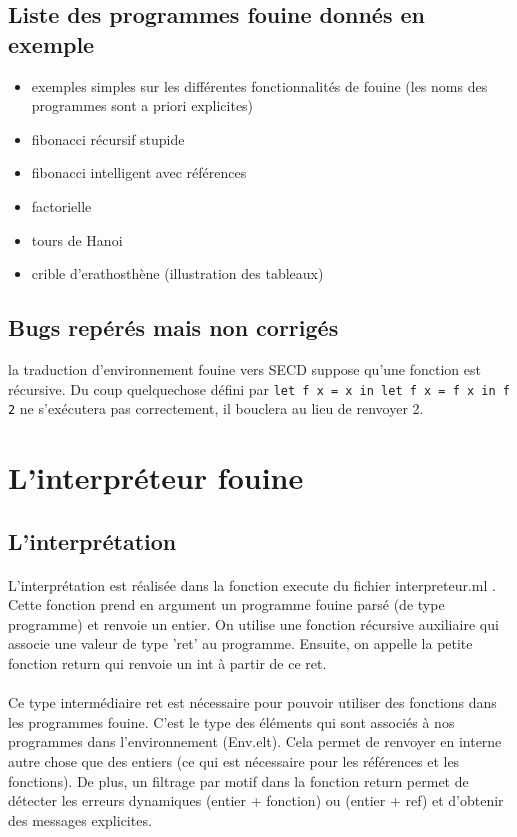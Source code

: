 \subsection{Liste des programmes fouine donnés en exemple}

\begin{itemize}
 \item exemples simples sur les différentes fonctionnalités de fouine (les noms des programmes sont a priori explicites)
 \item fibonacci récursif stupide
 \item fibonacci intelligent avec références
 \item factorielle
 \item tours de Hanoi
 \item crible d'erathosthène (illustration des tableaux)
\end{itemize}

\subsection{Bugs repérés mais non corrigés}

la traduction d'environnement fouine vers SECD suppose qu'une fonction est récursive. Du coup quelquechose défini par
\texttt{let f x = x in let f x = f x in f 2} ne s'exécutera pas correctement, il bouclera au lieu de renvoyer 2.

\section{L'interpréteur fouine} %

\subsection{L'interprétation}

\paragraph{} L'interprétation est réalisée dans la fonction execute du fichier interpreteur.ml . Cette fonction prend en argument un programme fouine parsé (de type programme) et renvoie un entier. On utilise une fonction récursive auxiliaire qui associe une valeur de type 'ret' au programme. Ensuite, on appelle la petite fonction return qui renvoie un int à partir de ce ret.

\paragraph{} Ce type intermédiaire ret est nécessaire pour pouvoir utiliser des fonctions dans les programmes fouine. C'est le type des éléments qui sont associés à nos programmes dans l'environnement (Env.elt). Cela permet de renvoyer en interne autre chose que des entiers (ce qui est nécessaire pour les références et les fonctions). De plus, un filtrage par motif dans la fonction return permet de détecter les erreurs dynamiques (entier + fonction) ou (entier + ref) et d'obtenir des messages explicites.

